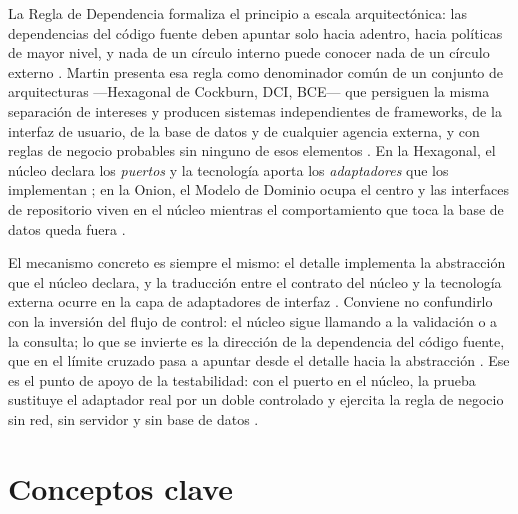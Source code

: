 La Regla de Dependencia formaliza el principio a escala arquitectónica: las dependencias del
código fuente deben apuntar solo hacia adentro, hacia políticas de mayor nivel, y nada de un
círculo interno puede conocer nada de un círculo externo \parencite[203]{martin2017}. Martin
presenta esa regla como denominador común de un conjunto de arquitecturas —Hexagonal de
Cockburn, DCI, BCE— que persiguen la misma separación de intereses y producen sistemas
independientes de frameworks, de la interfaz de usuario, de la base de datos y de cualquier
agencia externa, y con reglas de negocio probables sin ninguno de esos elementos
\parencite[202]{martin2017}. En la Hexagonal, el núcleo declara los \emph{puertos} y la
tecnología aporta los \emph{adaptadores} que los implementan \parencite{cockburn2005}; en la
Onion, el Modelo de Dominio ocupa el centro y las interfaces de repositorio viven en el núcleo
mientras el comportamiento que toca la base de datos queda fuera \parencite{palermo2008}.

El mecanismo concreto es siempre el mismo: el detalle implementa la abstracción que el núcleo
declara, y la traducción entre el contrato del núcleo y la tecnología externa ocurre en la capa
de adaptadores de interfaz \parencite[205]{martin2017}. Conviene no confundirlo con la inversión
del flujo de control: el núcleo sigue llamando a la validación o a la consulta; lo que se
invierte es la dirección de la dependencia del código fuente, que en el límite cruzado pasa a
apuntar desde el detalle hacia la abstracción \parencite[87, 91]{martin2017}. Ese es el punto de
apoyo de la testabilidad: con el puerto en el núcleo, la prueba sustituye el adaptador real por
un doble controlado y ejercita la regla de negocio sin red, sin servidor y sin base de datos
\parencite[202]{martin2017}.

\section{Conceptos clave}

